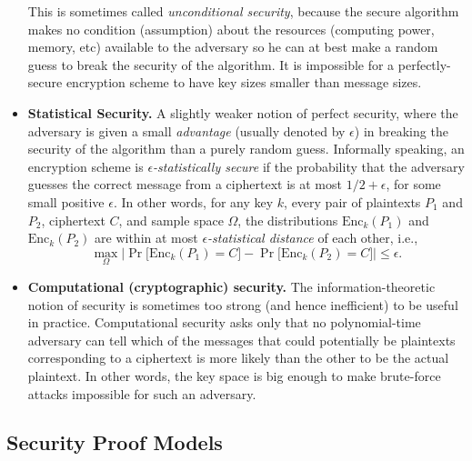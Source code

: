 \documentclass[11pt]{article}
\theoremstyle{plain}
\begin{document}
\begin{itemize}
	This is sometimes called \emph{unconditional security}, because the
	secure algorithm makes no condition (assumption) about the resources
	(computing power, memory, etc) available to the adversary so he can
	at best make a random guess to break the security of the algorithm.
	It is impossible for a perfectly-secure encryption scheme to have
	key sizes smaller than message sizes.
	\item \textbf{Statistical Security.} A slightly weaker notion of perfect
	security, where the adversary is given a small \emph{advantage} (usually
	denoted by $\epsilon$) in breaking the security of the algorithm
	than a purely random guess. Informally speaking, an encryption scheme
	is \emph{$\epsilon$-statistically secure} if the probability that
	the adversary guesses the correct message from a ciphertext is at
	most $1/2+\epsilon$, for some small positive $\epsilon$. In other
	words, for any key $k$, every pair of plaintexts $P_{1}$ and $P_{2}$,
	ciphertext $C$, and sample space $\Omega$, the distributions $\text{Enc}_{k}(P_{1})$
	and $\text{Enc}_{k}(P_{2})$ are within at most \emph{$\epsilon$-statistical
		distance} of each other, i.e., 
	\[
	\max_{\Omega}\Big|\Pr\big[\text{Enc}_{k}(P_{1})=C\big]-\Pr\big[\text{Enc}_{k}(P_{2})=C\big]\Big|\leq\epsilon.
	\]
	\item \textbf{Computational (cryptographic) security.} The information-theoretic
	notion of security is sometimes too strong (and hence inefficient)
	to be useful in practice. Computational security asks only that no
	polynomial-time adversary can tell which of the messages that could
	potentially be plaintexts corresponding to a ciphertext is more likely
	than the other to be the actual plaintext. In other words, the key
	space is big enough to make brute-force attacks impossible for such
	an adversary. 
\end{itemize}

\subsection{Security Proof Models}
\end{document}
